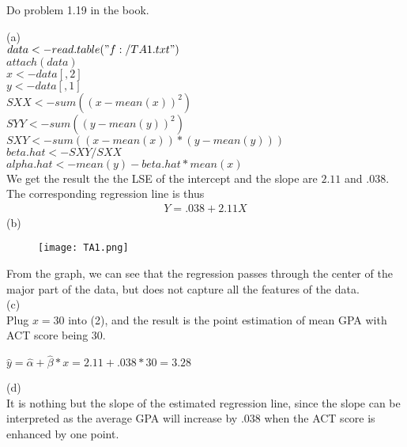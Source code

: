 \documentclass[12pt]{article}
\begin{document}
{
Do problem 1.19 in the book.
}
{
\vfill
  \answer
}
{
(a)\\
$data <- read.table("f:/TA1.txt")$\\
$attach(data)$\\
$x <- data[,2]$\\
$y <- data[,1]$\\
$SXX <- sum((x-mean(x))^2)$\\
$SYY <- sum((y-mean(y))^2)$\\
$SXY <- sum((x-mean(x))*(y-mean(y)))$\\
$beta.hat <- SXY/SXX$\\
$alpha.hat <- mean(y)-beta.hat*mean(x)$\\
We get the result the the LSE of the intercept and the slope are $2.11$ and $.038$.\\
The corresponding regression line is thus\\
\begin{eqnarray}
Y=.038+2.11X
\end{eqnarray}
(b)
\begin{figure}
\centering
\texttt{[image: TA1.png]}
\end{figure}
From the graph, we can see that the regression passes through the center of the major part of the data, but does not capture all the features of the data.\\
(c)\\
Plug $x=30$ into (2), and the result is the point estimation of mean GPA with ACT score being 30.\\
\begin{center}
$\hat{y}=\hat{\alpha}+\hat{\beta}*x=2.11+.038*30=3.28$
\end{center}
(d)\\
It is nothing but the slope of the estimated regression line, since
the slope can be interpreted as the average GPA will increase by
.038 when the ACT score is enhanced by one point.\\
}



\problemsdone
\end{document}
